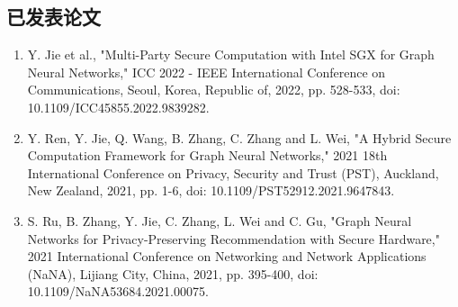 
\begin{publications}

\section*{已发表论文}

\begin{enumerate}
\item Y. Jie et al., "Multi-Party Secure Computation with Intel SGX for Graph Neural Networks," ICC 2022 - IEEE International Conference on Communications, Seoul, Korea, Republic of, 2022, pp. 528-533, doi: 10.1109/ICC45855.2022.9839282.
\item Y. Ren, Y. Jie, Q. Wang, B. Zhang, C. Zhang and L. Wei, "A Hybrid Secure Computation Framework for Graph Neural Networks," 2021 18th International Conference on Privacy, Security and Trust (PST), Auckland, New Zealand, 2021, pp. 1-6, doi: 10.1109/PST52912.2021.9647843.
\item S. Ru, B. Zhang, Y. Jie, C. Zhang, L. Wei and C. Gu, "Graph Neural Networks for Privacy-Preserving Recommendation with Secure Hardware," 2021 International Conference on Networking and Network Applications (NaNA), Lijiang City, China, 2021, pp. 395-400, doi: 10.1109/NaNA53684.2021.00075.
\end{enumerate}

%


\end{publications}
